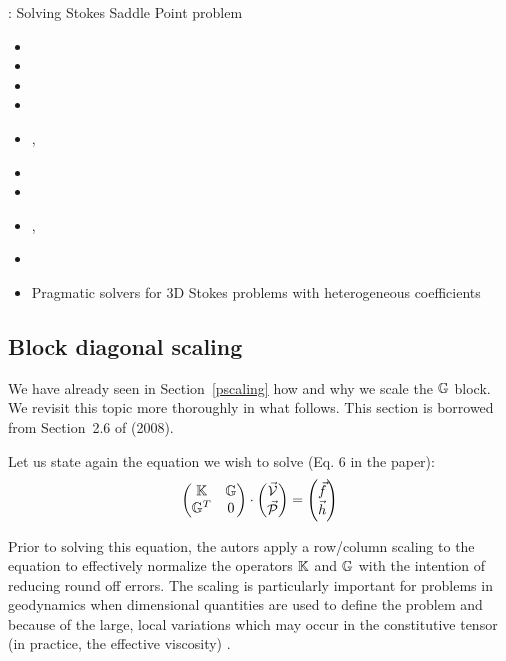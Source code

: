 \Literature: Solving Stokes Saddle Point problem
\begin{small}
\begin{itemize}
\item {}
\item {}
\item {}
\item {}
\item {}, 
\item {}
\item {}
\item {}, 
\item {}
\item Pragmatic solvers for 3D Stokes problems with heterogeneous coefficients \cite{samb20}
\end{itemize}
\end{small}



\subsection{Block diagonal scaling} \label{sec:block_scaling}

We have already seen in Section~\ref{pscaling} how and why we scale the ${\mathbb{G}}$ block. 
We revisit this topic more thoroughly in what follows.
This section is borrowed from Section~2.6 of \textcite{mamo08} (2008).

Let us state again the equation we wish to solve (Eq. 6 in the paper):
\[
\begin{pmatrix}
{\mathbb{K}} & {\mathbb{G}} \\
{\mathbb{G}}^T & 0
\end{pmatrix}
\cdot
\begin{pmatrix}
\vec{\cal V} \\
\vec{\cal P}
\end{pmatrix}
=
\begin{pmatrix}
\vec{f} \\
\vec{h}
\end{pmatrix}
\]

Prior to solving this equation, the autors apply a row/column scaling to the equation
to effectively normalize the operators ${\mathbb{K}}$ and ${\mathbb{G}}$ with the intention of
reducing round off errors. The scaling is particularly important for
problems in geodynamics when dimensional quantities are used to
define the problem and because of the large, local variations which
may occur in the constitutive tensor (in practice, the effective viscosity) . 

